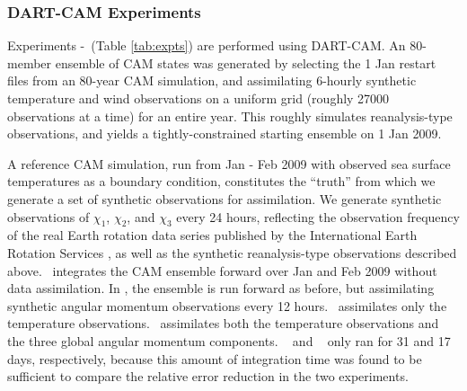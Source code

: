 

\subsubsection{DART-CAM Experiments}
Experiments \NODA-\ERPRST ~(Table \ref{tab:expts}) are performed using DART-CAM.  
An 80-member ensemble of CAM states was generated by selecting the 1 Jan restart files from an 80-year CAM simulation, and assimilating 6-hourly synthetic temperature and wind observations on a uniform grid (roughly 27000 observations at a time) for an entire year. 
This roughly simulates reanalysis-type observations, and yields a tightly-constrained starting ensemble on 1 Jan 2009.  

A reference CAM simulation, run from Jan - Feb 2009 with observed sea surface temperatures as a boundary condition, constitutes the ``truth'' from which we generate a set of synthetic observations for assimilation. 
We generate synthetic observations of $\chi_1$, $\chi_2$, and $\chi_3$ every 24 hours, reflecting the observation frequency of the real Earth rotation data series published by the International Earth Rotation Services \citep{iers}, as well as the synthetic reanalysis-type observations described above. 
\NODA ~integrates the CAM ensemble forward over Jan and Feb 2009 without data assimilation. 
In \ERPALL, the ensemble is run forward as before, but assimilating synthetic angular momentum observations every 12 hours.
\RST ~assimilates only the temperature observations.
\ERPRST ~assimilates both the temperature observations and the three global angular momentum components.
\RST~ and \ERPRST~ only ran for 31 and 17 days, respectively, because this amount of integration time was found to be sufficient to compare the relative error reduction in the two experiments. 
